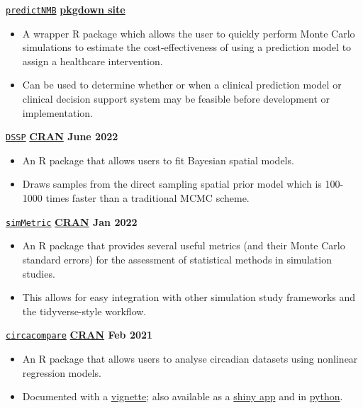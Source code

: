 \texttt{\href{https://github.com/RWParsons/predictNMB}{predictNMB}} \hfill \textbf{\href{https://rwparsons.github.io/predictNMB/}{pkgdown site}} \par
\begin{itemize}
    \item A wrapper R package which allows the user to quickly perform Monte Carlo simulations to estimate the cost-effectiveness of using a prediction model to assign a healthcare intervention.
    \item Can be used to determine whether or when a clinical prediction model or clinical decision support system may be feasible before development or implementation.
\end{itemize}

\texttt{\href{https://github.com/gentrywhite/DSSP}{DSSP}} \hfill \textbf{\href{https://cran.r-project.org/package=DSSP}{CRAN} June 2022} \par
\begin{itemize}
    \item An R package that allows users to fit Bayesian spatial models.
    \item Draws samples from the direct sampling spatial prior model which is 100-1000 times faster than a traditional MCMC scheme.
\end{itemize}

\texttt{\href{https://github.com/RWParsons/simMetric}{simMetric}} \hfill \textbf{\href{https://cran.r-project.org/package=simMetric}{CRAN}  Jan 2022} \par
\begin{itemize}
    \item An R package that provides several useful metrics (and their Monte Carlo standard errors) for the assessment of statistical methods in simulation studies.
    \item This allows for easy integration with other simulation study frameworks and the tidyverse-style workflow.
\end{itemize}

\texttt{\href{https://github.com/RWParsons/circacompare}{circacompare}} \hfill \textbf{\href{https://cran.r-project.org/package=circacompare}{CRAN} Feb 2021} \par
\begin{itemize}
    \item An R package that allows users to analyse circadian datasets using nonlinear regression models.
    \item Documented with a \href{https://cran.r-project.org/web/packages/circacompare/vignettes/circacompare-vignette.html}{vignette}; also available as a \href{https://rwparsons.shinyapps.io/circacompare/}{shiny app} and in \href{https://github.com/RWParsons/circacompare_py}{python}.
\end{itemize}
